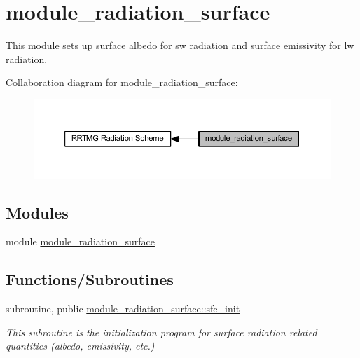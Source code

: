 \hypertarget{group__module__radiation__surface}{}\section{module\+\_\+radiation\+\_\+surface}
\label{group__module__radiation__surface}


This module sets up surface albedo for sw radiation and surface emissivity for lw radiation.  


Collaboration diagram for module\+\_\+radiation\+\_\+surface\+:\nopagebreak
\begin{figure}[H]
\begin{center}
\leavevmode
\includegraphics[width=350pt]{group__module__radiation__surface}
\end{center}
\end{figure}
\subsection*{Modules}
\begin{DoxyCompactItemize}
\item 
module \hyperlink{namespacemodule__radiation__surface}{module\+\_\+radiation\+\_\+surface}
\end{DoxyCompactItemize}
\subsection*{Functions/\+Subroutines}
\begin{DoxyCompactItemize}
\item 
subroutine, public \hyperlink{group__module__radiation__surface_gaeb08607a27653edcaca756366feff0c0}{module\+\_\+radiation\+\_\+surface\+::sfc\+\_\+init}
\begin{DoxyCompactList}\small\item\em This subroutine is the initialization program for surface radiation related quantities (albedo, emissivity, etc.) \end{DoxyCompactList}\end{DoxyCompactItemize}
